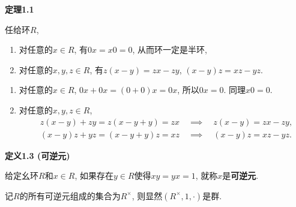 \documentclass[UTF8]{ctexart}
\begin{document}
\hypertarget{sec:定理1.1}{}
\noindent\textbf{定理1.1}

任给环$R$,
\begin{enumerate}
    \item 对任意的$x\in R$, 有$0x=x0=0$, 从而环一定是半环,
    \item 对任意的$x,y,z\in R$, 有$z(x-y)=zx-zy$, $(x-y)z=xz-yz$.
\end{enumerate}


\begin{enumerate}
    \item 对任意的$x\in R$, $0x+0x=(0+0)x=0x$, 所以$0x=0$. 同理$x0=0$.
    \item 对任意的$x,y,z\in R$,
    \begin{equation*}\begin{aligned}
        &z(x-y)+zy=z(x-y+y)=zx\quad\implies\quad z(x-y)=zx-zy,\\[-3pt]
        &(x-y)z+yz=(x-y+y)z=xz\quad\implies\quad(x-y)z=xz-yz.
    \end{aligned}\tag*{\qedsymbol}\end{equation*}
\end{enumerate}

\vspace{10pt}

\hypertarget{sec:定义1.3}{}
\noindent\textbf{定义1.3 (可逆元)}

给定幺环$R$和$x\in R$, 如果存在$y\in R$使得$xy=yx=1$, 就称$x$是\textbf{可逆元}.

记$R$的所有可逆元组成的集合为$R^\times$, 则显然$(R^\times,1,\cdot)$是群.
\end{document}
